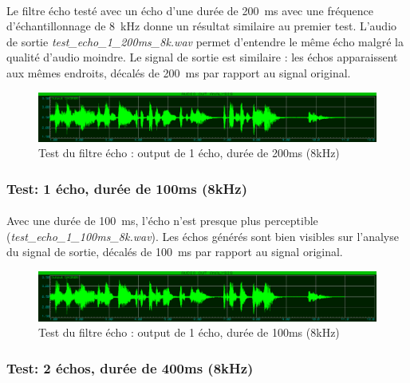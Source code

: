 \documentclass{article}
\begin{document}
    \paragraph{}
    Le filtre écho testé avec un écho d'une durée de \SI{200}{\milli\second} avec une fréquence d'échantillonnage de \SI{8}{\kilo\hertz} donne un résultat similaire au premier test. L'audio de sortie \emph{test\_echo\_1\_200ms\_8k.wav} permet d'entendre le même écho malgré la qualité d'audio moindre. Le signal de sortie est similaire : les échos apparaissent aux mêmes endroits, décalés de \SI{200}{\milli\second} par rapport au signal original.
    \begin{figure}[H]
        \centering
        \includegraphics[width=\textwidth]{./images/out_echo_1_200ms_8k.png}
        \caption{Test du filtre écho : output de 1 écho, durée de 200ms (8kHz)}
    \end{figure}

    \subsubsection{Test: 1 écho, durée de 100ms (8kHz)}
    \paragraph{}
    Avec une durée de \SI{100}{\milli\second}, l'écho n'est presque plus perceptible (\emph{test\_echo\_1\_100ms\_8k.wav}). Les échos générés sont bien visibles sur l'analyse du signal de sortie, décalés de \SI{100}{\milli\second} par rapport au signal original.
    \begin{figure}[H]
        \centering
        \includegraphics[width=\textwidth]{./images/out_echo_1_100ms_8k.png}
        \caption{Test du filtre écho : output de 1 écho, durée de 100ms (8kHz)}
    \end{figure}

    \subsubsection{Test: 2 échos, durée de 400ms (8kHz)}
\end{document}
